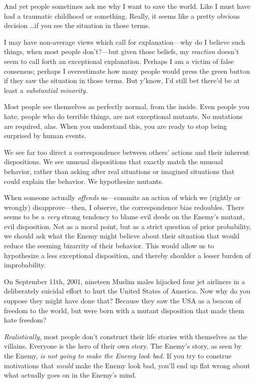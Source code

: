 {
 And yet people sometimes ask me why I want to save the world. Like
I must have had a traumatic childhood or something. Really, it seems
like a pretty obvious decision \ldots if you see the situation in those
terms.}

{
 I may have non-average views which call for explanation---why do I
believe such things, when most people don't?---but
given those beliefs, my \textit{reaction} doesn't seem
to call forth an exceptional explanation. Perhaps I am a victim of
false consensus; perhaps I overestimate how many people would press the
green button if they saw the situation in those terms. But
y'know, I'd still bet
there'd be at least a \textit{substantial minority.}}

{
 Most people see themselves as perfectly normal, from the inside.
Even people you hate, people who do terrible things, are not
exceptional mutants. No mutations are required, alas. When you
understand this, you are ready to stop being surprised by human
events.}

\myendsectiontext


\bigskip


{
 We see far too direct a correspondence between
others' actions and their inherent dispositions. We see
unusual dispositions that exactly match the unusual behavior, rather
than asking after real situations or imagined situations that could
explain the behavior. We hypothesize mutants. }

{
 When someone actually \textit{offends} us---commits an action of
which we (rightly or wrongly) disapprove---then, I observe, the
correspondence bias redoubles. There seems to be a \textit{very} strong
tendency to blame evil deeds on the Enemy's mutant,
evil disposition. Not as a moral point, but as a strict question of
prior probability, we should ask what the Enemy might believe about
their situation that would reduce the seeming bizarrity of their
behavior. This would allow us to hypothesize a less exceptional
disposition, and thereby shoulder a lesser burden of improbability.}

{
 On September 11th, 2001, nineteen Muslim males hijacked four jet
airliners in a deliberately suicidal effort to hurt the United States
of America. Now why do you suppose they might have done that? Because
they saw the USA as a beacon of freedom to the world, but were born
with a mutant disposition that made them hate freedom?}

{
 \textit{Realistically}, most people don't
construct their life stories with themselves as the villains. Everyone
is the hero of their own story. The Enemy's story, as
seen by the Enemy, \textit{is not going to make the Enemy look bad.} If
you try to construe motivations that \textit{would} make the Enemy look
bad, you'll end up flat wrong about what actually goes
on in the Enemy's mind.}

